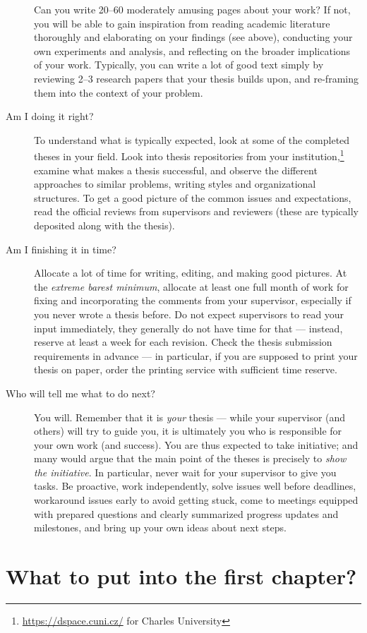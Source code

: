 \begin{description}
Can you write 20--60 moderately amusing pages about your work? If not, you will be able to gain inspiration from reading academic literature thoroughly and elaborating on your findings (see above), conducting your own experiments and analysis, and reflecting on the broader implications of your work. Typically, you can write a lot of good text simply by reviewing 2--3 research papers that your thesis builds upon, and re-framing them into the context of your problem.
\item[Am I doing it right?]
To understand what is typically expected, look at some of the completed theses in your field. Look into thesis repositories from your institution,\footnote{\url{https://dspace.cuni.cz/} for Charles University} examine what makes a thesis successful, and observe the different approaches to similar problems, writing styles and organizational structures. To get a good picture of the common issues and expectations, read the official reviews from supervisors and reviewers (these are typically deposited along with the thesis).
\item[Am I finishing it in time?]
Allocate a lot of time for writing, editing, and making good pictures. At the \emph{extreme barest minimum}, allocate at least one full month of work for fixing and incorporating the comments from your supervisor, especially if you never wrote a thesis before. Do not expect supervisors to read your input immediately, they generally do not have time for that --- instead, reserve at least a week for each revision. Check the thesis submission requirements in advance --- in particular, if you are supposed to print your thesis on paper, order the printing service with sufficient time reserve.
\item[Who will tell me what to do next?]
You will. Remember that it is \emph{your} thesis --- while your supervisor (and others) will try to guide you, it is ultimately you who is responsible for your own work (and success). You are thus expected to take initiative; and many would argue that the main point of the theses is precisely to \emph{show the initiative}. In particular, never wait for your supervisor to give you tasks. Be proactive, work independently, solve issues well before deadlines, workaround issues early to avoid getting stuck, come to meetings equipped with prepared questions and clearly summarized progress updates and milestones, and bring up your own ideas about next steps.
\end{description}

\section{What to put into the first chapter?}

